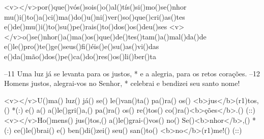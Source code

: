 <v></v>por()que()vós()sois()o()al()tís()si()mo()se()nhor
mu()i()to()a()ci()ma()do()u()ni()ver()so()que()cri()as()tes
e()de()mu()i()to()su()pe()rais()to()dos()os()deu()ses
<v></v>o()se()nhor()a()ma()os()que()de()tes()tam()a()mal()da()de
e()le()pro()te()ge()seus()fi()éis()e()su()as()vi()das
e()da()mão()dos()pe()ca()do()res()os()li()ber()ta

–11 Uma luz já se levanta para os justos, * 
e a alegria, para os retos corações. 
–12 Homens justos, alegrai-vos no Senhor, * 
celebrai e bendizei seu santo nome!

<v></v>U()ma() luz() já() se() le()van()ta() pa()ra() os() <b>jus</b>(r1)tos,() *(:)
e() a() a()le()gri()a,() pa()ra() os() re()tos() co()ra()<b>ções</b>.() (::)
<v></v>Ho()mens() jus()tos,() a()le()grai-()vos() no() Se()<b>nhor</b>,() *(:)
ce()le()brai() e() ben()di()zei() seu() san()to() <b>no</b>(r1)me!() (::)